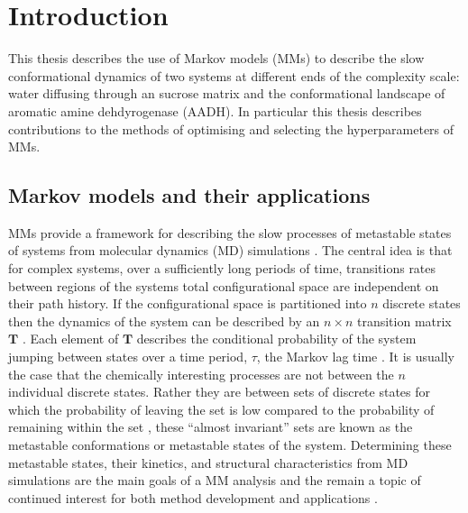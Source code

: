 %
%
\let\textcircled=\pgftextcircled
\chapter{Introduction}
\label{chap:intro}
This thesis describes the use of Markov models (MMs) to describe the slow conformational  dynamics of two systems at different ends of the complexity scale: water diffusing through an sucrose matrix and the conformational landscape of aromatic amine dehdyrogenase (AADH). In particular this thesis describes contributions to the methods of optimising and selecting the hyperparameters of MMs. 

\section{Markov models and their applications}
MMs provide a framework for describing the slow processes of metastable states of systems from molecular dynamics (MD) simulations \cite{prinzMarkovModelsMolecular2011}. The central idea \cite{zwanzigClassicalDynamicsContinuous1983a} is that for complex systems, over a sufficiently long periods of time, transitions rates between regions of the systems total configurational space are independent on their path history. If the configurational space is partitioned into $n$ discrete states then the dynamics of the system can be described by an $n\times n$ transition matrix $\mathbf{T}$ \cite{prinzMarkovModelsMolecular2011}. Each element of $\mathbf{T}$ describes the conditional probability of the system jumping between states over a time period, $\tau$, the Markov lag time \cite{prinzMarkovModelsMolecular2011}. It is usually the case that the chemically interesting processes are not between the $n$ individual discrete states. Rather they are between sets of discrete states for which the probability of leaving the set is low compared to the probability of remaining within the set \cite{schutteDirectApproachConformational1999}, these ``almost invariant'' sets are known as the metastable conformations or metastable states of the system. Determining these metastable states, their kinetics, and structural characteristics from MD simulations are the main goals of a MM analysis and the remain a topic of continued interest for both method development and applications \cite{husicMarkovStateModels2018,noeMarkovModelsMolecular2019b, wangConstructingMarkovState2018c}.  

